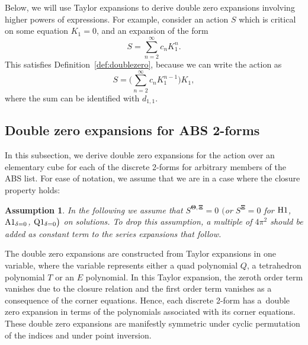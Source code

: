 \documentclass[10pt,a4paper]{amsart}
\renewcommand{\vec}{\boldsymbol}
\newtheorem{Assumption}[Definition]{Assumption}
\numberwithin{equation}{section}
\begin{document}
Below, we will use Taylor expansions to derive double zero expansions involving higher powers of expressions. For example, consider an action $S$ which is critical on some equation $K_1 = 0$, and an expansion of the form
\[ S = \sum_{n = 2}^\infty c_{n} K_1^n . \]
This satisfies Definition~\ref{def:doublezero}, because we can write the action as
\[ S = \Biggl( \sum_{n = 2}^\infty c_{n} K_1^{n-1} \Biggr) K_1 , \]
where the sum can be identified with $d_{1,1}$.

\subsection{Double zero expansions for ABS 2-forms}
\label{sec-double0-ABS}

In this subsection, we derive double zero expansions for the action over an elementary cube for each of the discrete 2-forms for arbitrary members of the ABS list. For ease of notation, we assume that we are in a case where the closure property holds:

\begin{Assumption}
\label{assumption}
In the following we assume that $S^{\vec \Theta, \vec \Xi} = 0$ $\bigl($or $S^{\vec \Xi} = 0$ for ${\rm H}1$, ${\rm A}1_{\delta=0}$, ${\rm Q}1_{\delta=0}\bigr)$ on solutions. To drop this assumption, a multiple of $4 \pi^2$ should be added as constant term to the series expansions that follow.
\end{Assumption}

The double zero expansions are constructed from Taylor expansions in one variable, where the variable represents either a quad polynomial $Q$, a tetrahedron polynomial $T$ or an $E$ polynomial. In this Taylor expansion, the zeroth order term vanishes due to the closure relation and the first order term vanishes as a consequence of the corner equations. Hence, each discrete 2-form has a~double zero expansion in terms of the polynomials associated with its corner equations. These double zero expansions are manifestly symmetric under cyclic permutation of the indices and under point inversion.
\end{document}

